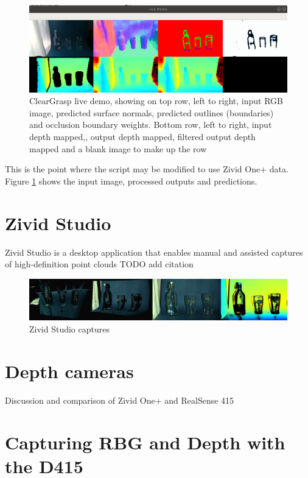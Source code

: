 \begin{figure}[h!]
\centering
\includegraphics[width=\textwidth]{Figures/ClearGraspLiveDemoForReport.png}
\caption{ClearGrasp live demo, showing on top row, left to right, input RGB image, predicted surface normals, predicted outlines (boundaries) and occlusion boundary weights. Bottom row, left to right, input depth mapped,, output depth mapped, filtered output depth mapped and a blank image to make up the row}
\label{fig:ClearGraspLiveDemoForReport}
\end{figure}

This is the point where the script may be modified to use Zivid One+ data. Figure \ref{fig:ClearGraspLiveDemoForReport} shows the input image, processed outputs and predictions. 

\section{Zivid Studio}
Zivid Studio is a desktop application that enables manual and assisted captures of high-definition point clouds
TODO add citation

\begin{figure}[h!]
\centering
\includegraphics[width=\textwidth]{Figures/ZividStudio.png}
\caption{Zivid Studio captures}
\label{fig:ZividStudio}
\end{figure}

\section{Depth cameras}
Discussion and comparison of Zivid One+ and RealSense 415

\section{Capturing RBG and Depth with the D415}

